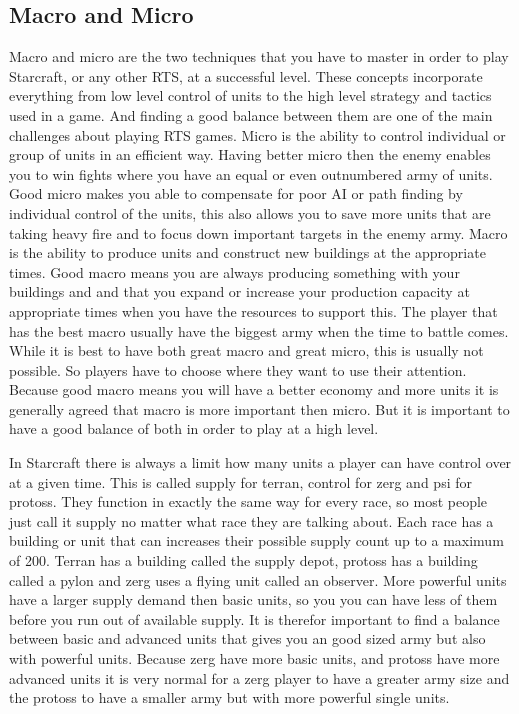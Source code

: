 \subsection{Macro and Micro}
Macro and micro are the two techniques that you have to master in order to play Starcraft, or any other RTS, at a successful level. These concepts incorporate everything from low level control of units to the high level strategy and tactics used in a game. And finding a good balance between them are one of the main challenges about playing RTS games. 
Micro is the ability to control individual or group of units in an efficient way. Having better micro then the enemy enables you to win fights where you have an equal or even outnumbered army of units. Good micro makes you able to compensate for poor AI or path finding by individual control of the units, this also allows you to save more units that are taking heavy fire and to focus down important targets in the enemy army. 
Macro is the ability to produce units and construct new buildings at the appropriate times. Good macro means you are always producing something with your buildings and and that you expand or increase your production capacity at appropriate times when you have the resources to support this. The player that has the best macro usually have the biggest army when the time to battle comes. 
While it is best to have both great macro and great micro, this is usually not possible. So players have to choose where they want to use their attention. Because good macro means you will have a better economy and more units it is generally agreed that macro is more important then micro. But it is important to have a good balance of both in order to play at a high level. 

In Starcraft there is always a limit how many units a player can have control over at a given time. This is called supply for terran, control for zerg and psi for protoss. They function in exactly the same way for every race, so most people just call it supply no matter what race they are talking about. Each race has a building or unit that can increases their possible supply count up to a maximum of 200. Terran has a building called the supply depot, protoss has a building called a pylon and zerg uses a flying unit called an observer. More powerful units have a larger supply demand then basic units, so you you can have less of them before you run out of available supply. It is therefor important to find a balance between basic and advanced units that gives you an good sized army but also with powerful units. Because zerg have more basic units, and protoss have more advanced units it is very normal for a zerg player to have a greater army size and the protoss to have a smaller army but with more powerful single units. 

